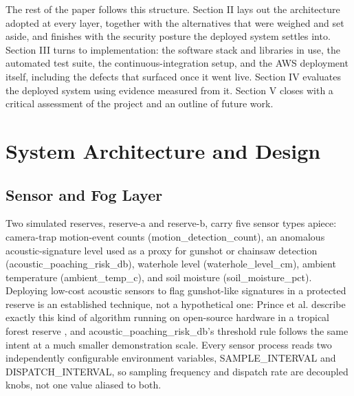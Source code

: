 \documentclass[conference,a4paper]{IEEEtran}
\begin{document}
The rest of the paper follows this structure. Section II lays out the architecture adopted at every layer, together with the alternatives that were weighed and set aside, and finishes with the security posture the deployed system settles into. Section III turns to implementation: the software stack and libraries in use, the automated test suite, the continuous-integration setup, and the AWS deployment itself, including the defects that surfaced once it went live. Section IV evaluates the deployed system using evidence measured from it. Section V closes with a critical assessment of the project and an outline of future work.

\section{System Architecture and Design}

\subsection{Sensor and Fog Layer}

Two simulated reserves, reserve-a and reserve-b, carry five sensor types apiece: camera-trap motion-event counts (motion\_detection\_count), an anomalous acoustic-signature level used as a proxy for gunshot or chainsaw detection (acoustic\_poaching\_risk\_db), waterhole level (waterhole\_level\_cm), ambient temperature (ambient\_temp\_c), and soil moisture (soil\_moisture\_pct). Deploying low-cost acoustic sensors to flag gunshot-like signatures in a protected reserve is an established technique, not a hypothetical one: Prince et al. describe exactly this kind of algorithm running on open-source hardware in a tropical forest reserve \cite{ref3}, and acoustic\_poaching\_risk\_db's threshold rule follows the same intent at a much smaller demonstration scale. Every sensor process reads two independently configurable environment variables, SAMPLE\_INTERVAL and DISPATCH\_INTERVAL, so sampling frequency and dispatch rate are decoupled knobs, not one value aliased to both.
\end{document}
